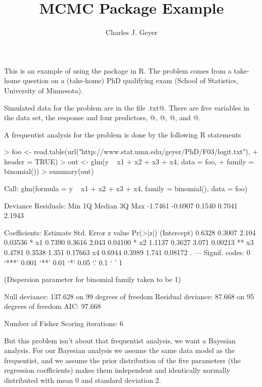 \documentclass{article}
\title{MCMC Package Example}
\author{Charles J. Geyer}
\begin{document}
\maketitle


This is an example of using the \verb@mcmc@ package in R.  The problem comes
from a take-home question on a (take-home) PhD qualifying exam
(School of Statistics, University of Minnesota).

Simulated data for the problem are in the file \verb@logit.txt@.
There are five variables in the data set, the response \verb@y@
and four predictors, @, @, @, and @.

A frequentist analysis for the problem is done by the following R statements
\begin{Schunk}
\begin{Sinput}
> foo <- read.table(url("http://www.stat.umn.edu/geyer/PhD/F03/logit.txt"), 
+     header = TRUE)
> out <- glm(y ~ x1 + x2 + x3 + x4, data = foo, 
+     family = binomial())
> summary(out)
\end{Sinput}
\begin{Soutput}
Call:
glm(formula = y ~ x1 + x2 + x3 + x4, family = binomial(), data = foo)

Deviance Residuals: 
    Min       1Q   Median       3Q      Max  
-1.7461  -0.6907   0.1540   0.7041   2.1943  

Coefficients:
            Estimate Std. Error z value Pr(>|z|)   
(Intercept)   0.6328     0.3007   2.104  0.03536 * 
x1            0.7390     0.3616   2.043  0.04100 * 
x2            1.1137     0.3627   3.071  0.00213 **
x3            0.4781     0.3538   1.351  0.17663   
x4            0.6944     0.3989   1.741  0.08172 . 
---
Signif. codes:  0 ‘***’ 0.001 ‘**’ 0.01 ‘*’ 0.05 ‘.’ 0.1 ‘ ’ 1 

(Dispersion parameter for binomial family taken to be 1)

    Null deviance: 137.628  on 99  degrees of freedom
Residual deviance:  87.668  on 95  degrees of freedom
AIC: 97.668

Number of Fisher Scoring iterations: 6
\end{Soutput}
\end{Schunk}

But this problem isn't about that frequentist analysis, we want a Bayesian
analysis.  For our Bayesian analysis we assume the same data model as the
frequentist, and we assume the prior distribution of the five parameters
(the regression coefficients) makes them independent and identically
normally distributed with mean 0 and standard deviation 2.
\end{document}
